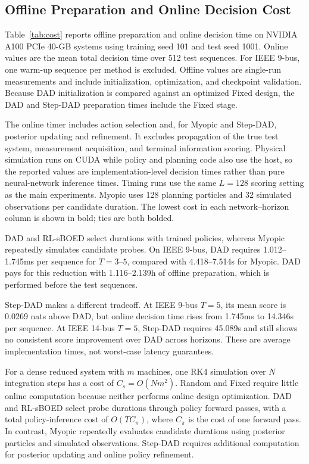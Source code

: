\documentclass[conference,letterpaper]{IEEEtran}
\begin{document}
\subsection{Offline Preparation and Online Decision Cost}\label{sec:cost}
Table~\ref{tab:cost} reports offline preparation and online decision time on NVIDIA A100 PCIe 40-GB systems using training seed 101 and test seed 1001. Online values are the mean total decision time over 512 test sequences. For IEEE 9-bus, one warm-up sequence per method is excluded. Offline values are single-run measurements and include initialization, optimization, and checkpoint validation. Because DAD initialization is compared against an optimized Fixed design, the DAD and Step-DAD preparation times include the Fixed stage.

The online timer includes action selection and, for Myopic and Step-DAD, posterior updating and refinement. It excludes propagation of the true test system, measurement acquisition, and terminal information scoring. Physical simulation runs on CUDA while policy and planning code also use the host, so the reported values are implementation-level decision times rather than pure neural-network inference times. Timing runs use the same $L=128$ scoring setting as the main experiments. Myopic uses 128 planning particles and 32 simulated observations per candidate duration. The lowest cost in each network--horizon column is shown in bold; ties are both bolded.


DAD and RL-sBOED select durations with trained policies, whereas Myopic repeatedly simulates candidate probes. On IEEE 9-bus, DAD requires 1.012--1.745ms per sequence for $T=3$--$5$, compared with 4.418--7.514s for Myopic. DAD pays for this reduction with 1.116--2.139h of offline preparation, which is performed before the test sequences.

Step-DAD makes a different tradeoff. At IEEE 9-bus $T=5$, its mean score is 0.0269 nats above DAD, but online decision time rises from 1.745ms to 14.346s per sequence. At IEEE 14-bus $T=5$, Step-DAD requires 45.089s and still shows no consistent score improvement over DAD across horizons. These are average implementation times, not worst-case latency guarantees.



For a dense reduced system with $m$ machines, one RK4 simulation over $N$ integration steps has a cost of $C_s=O(Nm^2)$. Random and Fixed require little online computation because neither performs online design optimization. DAD and RL-sBOED select probe durations through policy forward passes, with a total policy-inference cost of $O(TC_\pi)$, where $C_\pi$ is the cost of one forward pass. In contrast, Myopic repeatedly evaluates candidate durations using posterior particles and simulated observations. Step-DAD requires additional computation for posterior updating and online policy refinement.
\end{document}
